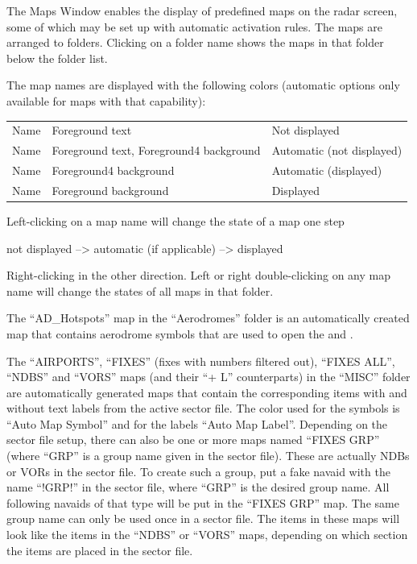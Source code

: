 \documentclass[11pt,a4paper]{memoir}
\begin{document}
The Maps Window enables the display of predefined maps on the radar screen, some of which may be set
up with automatic activation rules. The maps are arranged to folders. Clicking on a folder name shows the
maps in that folder below the folder list.

The map names are displayed with the following colors (automatic options only available for maps with
that capability):

\begin{tabular}{l l l}
    Name & Foreground text                          & Not displayed\\
    Name & Foreground text, Foreground4 background  & Automatic (not displayed)\\
    Name & Foreground4 background                   & Automatic (displayed)\\
    Name & Foreground background                    & Displayed\\    
\end{tabular}

Left-clicking on a map name will change the state of a map one step

not displayed --> automatic (if applicable) --> displayed

Right-clicking in the other direction. Left or right double-clicking on any map name will change the states of all maps in that folder.

The “AD\_Hotspots” map in the “Aerodromes” folder is an automatically created map that contains aerodrome symbols that are used to open the \textit{} and \textit{}.

The “AIRPORTS”, “FIXES” (fixes with numbers filtered out), “FIXES ALL”, “NDBS” and “VORS” maps (and their “+ L” counterparts) in the “MISC” folder are automatically generated maps that contain the corresponding items with and without text labels from the active sector file. The color used for the symbols is “Auto Map Symbol” and for the labels “Auto Map Label”. Depending on the sector file setup, there can also be one or more maps named “FIXES GRP” (where “GRP” is a group name given in the sector file). These are actually NDBs or VORs in the sector file. To create such a group, put a fake navaid with the name “!GRP!” in the sector file, where “GRP” is the desired group name. All following navaids of that type will be put in the “FIXES GRP” map. The same group name can only be used once in a sector file. The items in these maps will look like the items in the “NDBS” or “VORS” maps, depending on which section the items are placed in the sector file.
\end{document}
